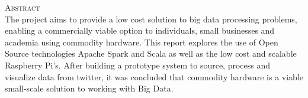 \documentclass[12pt]{article} %
\begin{document}
				\begin{figure}[H] %
					\label{fig:speciation}
				\end{figure}
		
		
		\newpage
		
		\begin{flushleft}\large
			\textsc{Abstract}\\
			The project aims to provide a low cost solution to big data processing problems, enabling a commercially viable option to individuals, small businesses and academia using commodity hardware. This report explores the use of  Open Source technologies Apache Spark and Scala as well as the low cost and scalable Raspberry Pi's. After building a prototype system to source, process and visualize data from twitter, it was concluded that  commodity hardware is a viable small-scale solution to working with Big Data.
			
		\end{flushleft}
	
\end{document}
